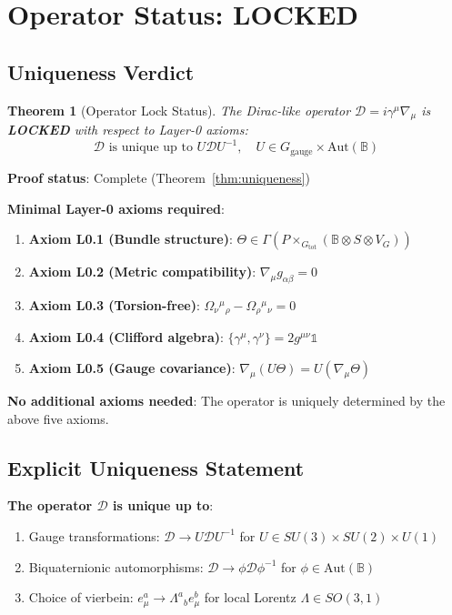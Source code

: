 \documentclass[12pt]{article}
\newtheorem{theorem}[definition]{Theorem}
\newcommand{\B}{\mathbb{B}}
\begin{document}
\section{Operator Status: LOCKED}

\subsection{Uniqueness Verdict}

\begin{theorem}[Operator Lock Status]
The Dirac-like operator $\mathcal{D} = i \gamma^\mu \nabla_\mu$ is \textbf{LOCKED} with respect to Layer-0 axioms:
\begin{equation}
\mathcal{D} \text{ is unique up to } U \mathcal{D} U^{-1}, \quad U \in G_{\text{gauge}} \times \mathrm{Aut}(\B)
\end{equation}
\end{theorem}

\textbf{Proof status}: Complete (Theorem~\ref{thm:uniqueness})

\textbf{Minimal Layer-0 axioms required}:
\begin{enumerate}
    \item \textbf{Axiom L0.1 (Bundle structure)}: $\Theta \in \Gamma(P \times_{G_{\text{tot}}} (\B \otimes S \otimes V_G))$
    \item \textbf{Axiom L0.2 (Metric compatibility)}: $\nabla_\mu g_{\alpha\beta} = 0$
    \item \textbf{Axiom L0.3 (Torsion-free)}: $\Omega_\nu{}^\mu{}_\rho - \Omega_\rho{}^\mu{}_\nu = 0$
    \item \textbf{Axiom L0.4 (Clifford algebra)}: $\{\gamma^\mu, \gamma^\nu\} = 2 g^{\mu\nu} \mathbb{1}$
    \item \textbf{Axiom L0.5 (Gauge covariance)}: $\nabla_\mu (U \Theta) = U (\nabla_\mu \Theta)$
\end{enumerate}

\textbf{No additional axioms needed}: The operator is uniquely determined by the above five axioms.

\subsection{Explicit Uniqueness Statement}

\textbf{The operator $\mathcal{D}$ is unique up to}:
\begin{enumerate}
    \item Gauge transformations: $\mathcal{D} \to U \mathcal{D} U^{-1}$ for $U \in SU(3) \times SU(2) \times U(1)$
    \item Biquaternionic automorphisms: $\mathcal{D} \to \phi \mathcal{D} \phi^{-1}$ for $\phi \in \mathrm{Aut}(\B)$
    \item Choice of vierbein: $e_\mu^a \to \Lambda^a{}_b e_\mu^b$ for local Lorentz $\Lambda \in SO(3,1)$
\end{enumerate}
\end{document}
